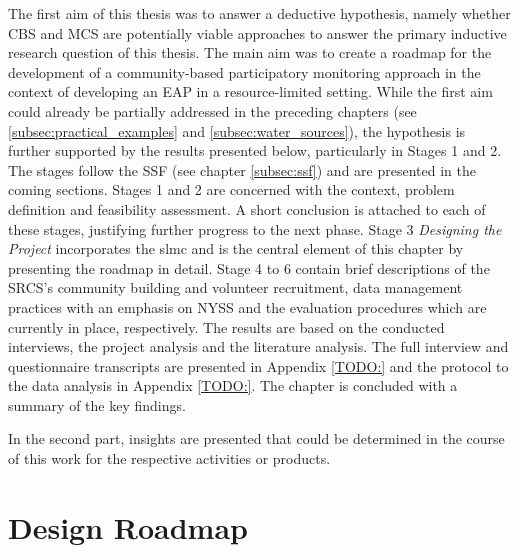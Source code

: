 The first aim of this thesis was to answer a deductive hypothesis, namely whether CBS and MCS are potentially viable approaches to answer the primary inductive research question of this thesis. The main aim was to create a roadmap for the development of a community-based participatory monitoring approach in the context of developing an EAP in a resource-limited setting. While the first aim could already be partially addressed in the preceding chapters (see \ref*{subsec:practical_examples} and \ref*{subsec:water_sources}), the hypothesis is further supported by the results presented below, particularly in Stages 1 and 2. %
The stages follow the SSF (see chapter \ref*{subsec:ssf}) and are presented in the coming sections. Stages 1 and 2 are concerned with the context, problem definition and feasibility assessment. A short conclusion is attached to each of these stages, justifying further progress to the next phase. Stage 3 \textit{Designing the Project} incorporates the \acrshort*{slmc} and is the central element of this chapter by presenting the roadmap in detail. Stage 4 to 6 contain brief descriptions of the SRCS's community building and volunteer recruitment, data management practices with an emphasis on NYSS and the evaluation procedures which are currently in place, respectively. The results are based on the conducted interviews, the project analysis and the literature analysis. The full interview and questionnaire transcripts are presented in Appendix \ref*{TODO:} and the protocol to the data analysis in Appendix \ref*{TODO:}. The chapter is concluded with a summary of the key findings.


In the second part, insights are presented that could be determined in the course of this work for the respective activities or products.


\section{Design Roadmap}

% 




